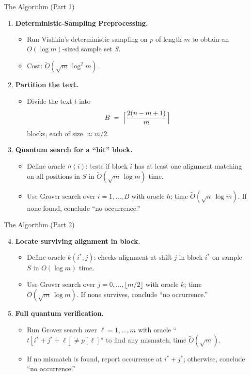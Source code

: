 \documentclass{beamer}
\begin{document}
\begin{frame}{The Algorithm (Part 1)}
  \begin{enumerate}
    \item \textbf{Deterministic-Sampling Preprocessing.}
          \begin{itemize}
            \item Run Vishkin's deterministic-sampling on \(p\) of length \(m\) to obtain an \(O(\log m)\)-sized sample set \(S\).
            \item Cost: \(\widetilde O(\sqrt{m}\,\log^2 m)\).
          \end{itemize}
    \item \textbf{Partition the text.}
          \begin{itemize}
            \item Divide the text \(t\) into
                  \[
                    B \;=\; \Bigl\lceil \frac{2(n - m + 1)}{m} \Bigr\rceil
                  \]
                  blocks, each of size \(\approx m/2\).
          \end{itemize}
    \item \textbf{Quantum search for a “hit” block.}
          \begin{itemize}
            \item Define oracle \(h(i)\): tests if block \(i\) has at least one alignment matching on all positions in \(S\) in \(\widetilde O(\sqrt{m}\,\log m)\) time.
            \item Use Grover search over \(i=1,\dots,B\) with oracle \(h\); time \(\widetilde O(\sqrt{n}\,\log m)\). If none found, conclude “no occurrence.”
          \end{itemize}
  \end{enumerate}
\end{frame}

\begin{frame}{The Algorithm (Part 2)}
  \begin{enumerate}
    \setcounter{enumi}{3}
    \item \textbf{Locate surviving alignment in block.}
          \begin{itemize}
            \item Define oracle \(k(i^*,j)\): checks alignment at shift \(j\) in block \(i^*\) on sample \(S\) in \(O(\log m)\) time.
            \item Use Grover search over \(j=0,\dots,\lfloor m/2\rfloor\) with oracle \(k\); time \(\widetilde O(\sqrt{m}\,\log m)\). If none survives, conclude “no occurrence.”
          \end{itemize}
    \item \textbf{Full quantum verification.}
          \begin{itemize}
            \item Run Grover search over \(\ell=1,\dots,m\) with oracle “\(t[i^*+j^*+\ell]\neq p[\ell]\)” to find any mismatch; time \(\widetilde O(\sqrt{m})\).
            \item If no mismatch is found, report occurrence at \(i^*+j^*\); otherwise, conclude “no occurrence.”
          \end{itemize}
  \end{enumerate}
\end{frame}
\end{document}
